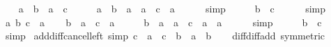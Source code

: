 \begin{isabellebody}
\ \ \isamarkupfalse%
\ {\isachardoublequoteopen}a\ {\isacharplus}{\kern0pt}\ b\ {\isacharequal}{\kern0pt}\ a\ {\isacharplus}{\kern0pt}\ c{\isachardoublequoteclose}\isanewline
\ \ \isamarkupfalse%
\ \isamarkupfalse%
\ {\isachardoublequoteopen}a\ {\isacharplus}{\kern0pt}\ b\ {\isacharminus}{\kern0pt}\ a\ {\isacharequal}{\kern0pt}\ a\ {\isacharplus}{\kern0pt}\ c\ {\isacharminus}{\kern0pt}\ a{\isachardoublequoteclose}\isanewline
\ \ \ \ \isamarkupfalse%
\ simp\isanewline
\ \ \isamarkupfalse%
\ \isamarkupfalse%
\ {\isachardoublequoteopen}b\ {\isacharequal}{\kern0pt}\ c{\isachardoublequoteclose}\isanewline
\ \ \ \ \isamarkupfalse%
\ simp\isanewline
{}\isamarkupfalse%
\isanewline
\ \ \isamarkupfalse%
\ a\ b\ c\ {\isacharcolon}{\kern0pt}{\isacharcolon}{\kern0pt}\ {\isacharprime}{\kern0pt}a\isanewline
\ \ \isamarkupfalse%
\ {\isachardoublequoteopen}b\ {\isacharplus}{\kern0pt}\ a\ {\isacharequal}{\kern0pt}\ c\ {\isacharplus}{\kern0pt}\ a{\isachardoublequoteclose}\isanewline
\ \ \isamarkupfalse%
\ \isamarkupfalse%
\ {\isachardoublequoteopen}b\ {\isacharplus}{\kern0pt}\ a\ {\isacharminus}{\kern0pt}\ a\ {\isacharequal}{\kern0pt}\ c\ {\isacharplus}{\kern0pt}\ a\ {\isacharminus}{\kern0pt}\ a{\isachardoublequoteclose}\isanewline
\ \ \ \ \isamarkupfalse%
\ simp\isanewline
\ \ \isamarkupfalse%
\ \isamarkupfalse%
\ {\isachardoublequoteopen}b\ {\isacharequal}{\kern0pt}\ c{\isachardoublequoteclose}\isanewline
\ \ \ \ \isamarkupfalse%
\ simp\isanewline
{}\isamarkupfalse%
%
\endisatagproof
{\isafoldproof}%
%
\isadelimproof
\isanewline
%
\endisadelimproof
\isanewline
{}\isamarkupfalse%
\ add{\isacharunderscore}{\kern0pt}diff{\isacharunderscore}{\kern0pt}cancel{\isacharunderscore}{\kern0pt}left\ {\isacharbrackleft}{\kern0pt}simp{\isacharbrackright}{\kern0pt}{\isacharcolon}{\kern0pt}\ {\isachardoublequoteopen}{\isacharparenleft}{\kern0pt}c\ {\isacharplus}{\kern0pt}\ a{\isacharparenright}{\kern0pt}\ {\isacharminus}{\kern0pt}\ {\isacharparenleft}{\kern0pt}c\ {\isacharplus}{\kern0pt}\ b{\isacharparenright}{\kern0pt}\ {\isacharequal}{\kern0pt}\ a\ {\isacharminus}{\kern0pt}\ b{\isachardoublequoteclose}\isanewline
%
\isadelimproof
\ \ %
\endisadelimproof
%
\isatagproof
{}\isamarkupfalse%
\ diff{\isacharunderscore}{\kern0pt}diff{\isacharunderscore}{\kern0pt}add\ {\isacharbrackleft}{\kern0pt}symmetric{\isacharbrackright}{\kern0pt}\ \isamarkupfalse%

\end{isabellebody}
